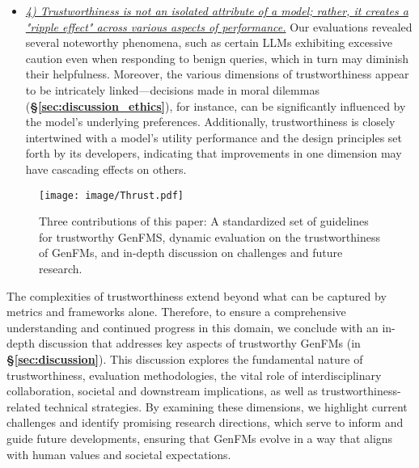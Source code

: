\begin{itemize}[nolistsep, leftmargin=*]
\item \textit{\ul{4) Trustworthiness is not an isolated attribute of a model; rather, it creates a "ripple effect" across various aspects of performance.}} Our evaluations revealed several noteworthy phenomena, such as certain LLMs exhibiting excessive caution even when responding to benign queries, which in turn may diminish their helpfulness. Moreover, the various dimensions of trustworthiness appear to be intricately linked—decisions made in moral dilemmas (\textbf{\S\ref{sec:discussion_ethics}}), for instance, can be significantly influenced by the model's underlying preferences. Additionally, trustworthiness is closely intertwined with a model’s utility performance and the design principles set forth by its developers, indicating that improvements in one dimension may have cascading effects on others. 

\end{itemize}

\begin{figure}
    \centering
    \texttt{[image: image/Thrust.pdf]}
    \caption{Three contributions of this paper: A standardized set of guidelines for trustworthy GenFMS, dynamic evaluation on the trustworthiness of GenFMs, and in-depth discussion on challenges and future research.}
    \label{fig:thrust}
    \vspace{-15pt}
\end{figure}


The complexities of trustworthiness extend beyond what can be captured by metrics and frameworks alone. Therefore, to ensure a comprehensive understanding and continued progress in this domain, we conclude with an in-depth discussion that addresses key aspects of trustworthy GenFMs (in \textbf{\S\ref{sec:discussion}}). This discussion explores the fundamental nature of trustworthiness, evaluation methodologies, the vital role of interdisciplinary collaboration, societal and downstream implications, as well as trustworthiness-related technical strategies. By examining these dimensions, we highlight current challenges and identify promising research directions, which serve to inform and guide future developments, ensuring that GenFMs evolve in a way that aligns with human values and societal expectations.


